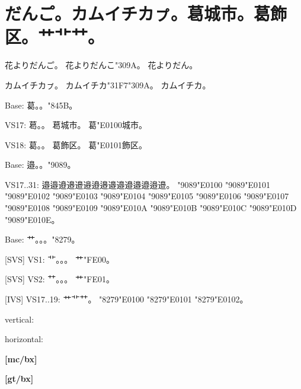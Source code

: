 \documentclass[a4paper,titlepage,dvipdfmx]{\class}
\begin{document}
\section{だんこ゚。カムイチカㇷ゚。葛󠄀城市。葛󠄁飾区。艹艹︀艹︁。}

\ifuptexmode
花よりだんこ゚。
花よりだんこ\kchar"309A。
花よりだん。

カムイチカㇷ゚。
カムイチカ\kchar"31F7\kchar"309A。
カムイチカ。



Base:
葛。。\kchar"845B。

VS17:
葛󠄀。。
葛󠄀城市。
葛\kchar"E0100城市。

VS18:
葛󠄁。。
葛󠄁飾区。
葛\kchar"E0101飾区。


Base:
邉。。\kchar"9089。

VS17..31:
邉󠄀邉󠄁邉󠄂邉󠄃邉󠄄邉󠄅邉󠄆邉󠄇邉󠄈邉󠄉邉󠄊邉󠄋邉󠄌邉󠄍邉󠄎。
\kchar"9089\kchar"E0100
\kchar"9089\kchar"E0101
\kchar"9089\kchar"E0102
\kchar"9089\kchar"E0103
\kchar"9089\kchar"E0104
\kchar"9089\kchar"E0105
\kchar"9089\kchar"E0106
\kchar"9089\kchar"E0107
\kchar"9089\kchar"E0108
\kchar"9089\kchar"E0109
\kchar"9089\kchar"E010A
\kchar"9089\kchar"E010B
\kchar"9089\kchar"E010C
\kchar"9089\kchar"E010D
\kchar"9089\kchar"E010E。


Base:
艹。。。\kchar"8279。

[SVS] VS1:
艹︀。。。
艹\kchar"FE00。

[SVS] VS2:
艹︁。。。
艹\kchar"FE01。

[IVS] VS17..19:
艹󠄀艹󠄁艹󠄂。
\kchar"8279\kchar"E0100
\kchar"8279\kchar"E0101
\kchar"8279\kchar"E0102。

\fi

\vspace{\baselineskip}
vertical:

\vspace{\baselineskip}
horizontal:

\clearpage
[mc/m]




{\bfseries%
[mc/bx]




}

{\gtfamily
[gt/m]




{\bfseries%
[gt/bx]




}}
\end{document}
